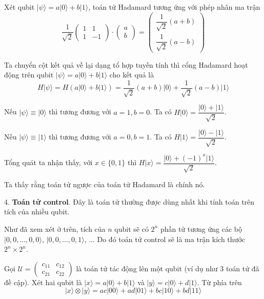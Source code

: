 \begin{example}
    Xét qubit $\lvert \psi \rangle = a \lvert 0 \rangle + b \lvert 1 \rangle$, toán tử Hadamard tương ứng với phép nhân ma trận
    \begin{equation*}
        \dfrac{1}{\sqrt{2}} \begin{pmatrix} 1 & 1 \\ 1 & - 1 \end{pmatrix} \cdot \begin{pmatrix} a \\ b \end{pmatrix} = \begin{pmatrix} \dfrac{1}{\sqrt{2}} (a + b) \\ \dfrac{1}{\sqrt{2}} (a - b) \end{pmatrix}
    \end{equation*}

    Ta chuyển cột kết quả về lại dạng tổ hợp tuyến tính thì cổng Hadamard hoạt động trên qubit $\lvert \psi \rangle = a \lvert 0 \rangle + b \lvert 1 \rangle$ cho kết quả là
    \begin{equation*}
        H \lvert \psi \rangle = H(a \lvert 0 \rangle + b \lvert 1 \rangle) = \dfrac{1}{\sqrt{2}} (a + b) \lvert 0 \rangle + \dfrac{1}{\sqrt{2}} (a - b) \lvert 1 \rangle
    \end{equation*}
\end{example}

Nếu $\lvert \psi \rangle \equiv \lvert 0 \rangle$ thì tương đương với $a = 1, b = 0$. Ta có $H \lvert 0 \rangle = \dfrac{\lvert 0 \rangle + \lvert 1 \rangle}{\sqrt{2}}$.

Nếu $\lvert \psi \rangle \equiv \lvert 1 \rangle$ thì tương đương với $a = 0, b = 1$. Ta có $H \lvert 1 \rangle = \dfrac{\lvert 0 \rangle - \lvert 1 \rangle}{\sqrt{2}}$.

Tổng quát ta nhận thấy, với $x \in \{ 0, 1 \}$ thì $H \lvert x \rangle = \dfrac{\lvert 0 \rangle + (-1)^x \lvert 1 \rangle}{\sqrt{2}}$.

Ta thấy rằng toán tử ngược của toán tử Hadamard là chính nó.

4. \textbf{Toán tử control}. Đây là toán tử thường được dùng nhất khi tính toán trên tích của nhiều qubit.

Như đã xem xét ở trên, tích của $n$ qubit sẽ có $2^n$ phần tử tương ứng các bộ $\lvert 0, 0, \ldots, 0, 0 \rangle$, $\lvert 0, 0, \ldots, 0, 1 \rangle$, ... Do đó toán tử control sẽ là ma trận kích thước $2^n \times 2^n$.

Gọi $\mathcal{U} = \begin{pmatrix} c_{11} & c_{12} \\ c_{21} & c_{22} \end{pmatrix}$ là toán tử tác động lên một qubit (ví dụ như 3 toán tử đã đề cập). Xét hai qubit là $\lvert x \rangle = a \lvert 0 \rangle + b \lvert 1 \rangle$ và $\lvert y \rangle = c \lvert 0 \rangle + d \lvert 1 \rangle$. Từ phía trên
\begin{equation*}
    \lvert x \rangle \otimes \lvert y \rangle = ac \lvert 00 \rangle + ad \lvert 01 \rangle + bc \lvert 10 \rangle + bd \lvert 11 \rangle
\end{equation*}


